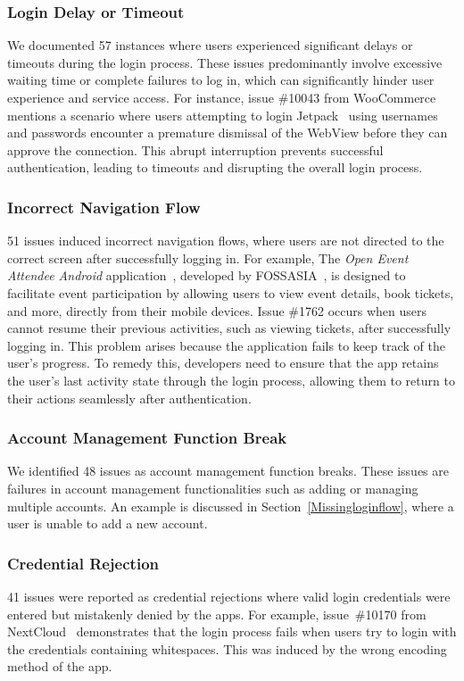\subsubsection{Login Delay or Timeout}
We documented 57 instances where users experienced significant delays or timeouts during the login process. These issues predominantly involve excessive waiting time or complete failures to log in, which can significantly hinder user experience and service access. For instance, issue \#10043 from WooCommerce~\cite{woocommerce-android} mentions a scenario where users attempting to login Jetpack~\cite{Jetpack} using usernames and passwords encounter a premature dismissal of the WebView before they can approve the connection. This abrupt interruption prevents successful authentication, leading to timeouts and disrupting the overall login process.


\subsubsection{Incorrect Navigation Flow}\label{IncorrectNavigationFlow}
51 issues induced incorrect navigation flows, where users are not directed to the correct screen after successfully logging in. For example, The \textit{Open Event Attendee Android} application~\cite{open-event-attendee-android}, developed by FOSSASIA~\cite{fossasia}, is designed to facilitate event participation by allowing users to view event details, book tickets, and more, directly from their mobile devices. Issue \#1762 occurs when users cannot resume their previous activities, such as viewing tickets, after successfully logging in. This problem arises because the application fails to keep track of the user's progress. To remedy this, developers need to ensure that the app retains the user's last activity state through the login process, allowing them to return to their actions seamlessly after authentication.

\subsubsection{Account Management Function Break}
We identified 48 issues as account management function breaks. These issues are failures in account management functionalities such as adding or managing multiple accounts. An example is discussed in Section~\ref{Missingloginflow}, where a user is unable to add a new account.

\subsubsection{Credential Rejection}\label{CredentialRecognitionErrors}
41 issues were reported as credential rejections where valid login credentials were entered but mistakenly denied by the apps.
For example, issue~\#10170 from NextCloud~\cite{nextcloud-android} demonstrates that the login process fails when users try to login with the credentials containing whitespaces.
This was induced by the wrong encoding method of the app. 


